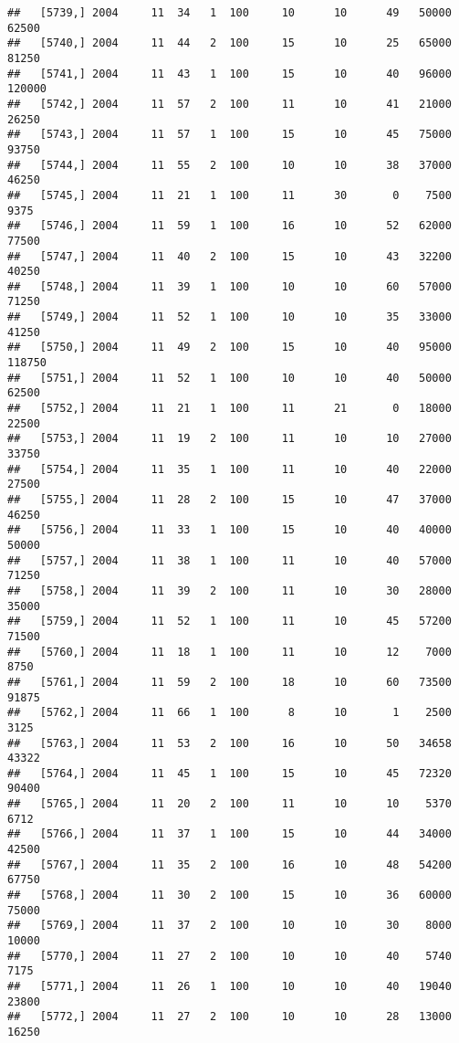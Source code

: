 \documentclass{article}\usepackage[]{graphicx}\usepackage[]{color}
\makeatletter
\newenvironment{kframe}{%
 \def\at@end@of@kframe{}%
 \ifinner\ifhmode%
  \def\at@end@of@kframe{\end{minipage}}%
  \begin{minipage}{\columnwidth}%
 \fi\fi%
 \def\FrameCommand##1{\hskip\@totalleftmargin \hskip-\fboxsep
 \colorbox{shadecolor}{##1}\hskip-\fboxsep
     \hskip-\linewidth \hskip-\@totalleftmargin \hskip\columnwidth}%
 \MakeFramed {\advance\hsize-\width
   \@totalleftmargin\z@ \linewidth\hsize
   \@setminipage}}%
 {\par\unskip\endMakeFramed%
 \at@end@of@kframe}
\newenvironment{knitrout}{}{} %
\makeatother
\begin{document}
\begin{knitrout}
\begin{kframe}
\begin{verbatim}
##   [5739,] 2004     11  34   1  100     10      10      49   50000   62500
##   [5740,] 2004     11  44   2  100     15      10      25   65000   81250
##   [5741,] 2004     11  43   1  100     15      10      40   96000  120000
##   [5742,] 2004     11  57   2  100     11      10      41   21000   26250
##   [5743,] 2004     11  57   1  100     15      10      45   75000   93750
##   [5744,] 2004     11  55   2  100     10      10      38   37000   46250
##   [5745,] 2004     11  21   1  100     11      30       0    7500    9375
##   [5746,] 2004     11  59   1  100     16      10      52   62000   77500
##   [5747,] 2004     11  40   2  100     15      10      43   32200   40250
##   [5748,] 2004     11  39   1  100     10      10      60   57000   71250
##   [5749,] 2004     11  52   1  100     10      10      35   33000   41250
##   [5750,] 2004     11  49   2  100     15      10      40   95000  118750
##   [5751,] 2004     11  52   1  100     10      10      40   50000   62500
##   [5752,] 2004     11  21   1  100     11      21       0   18000   22500
##   [5753,] 2004     11  19   2  100     11      10      10   27000   33750
##   [5754,] 2004     11  35   1  100     11      10      40   22000   27500
##   [5755,] 2004     11  28   2  100     15      10      47   37000   46250
##   [5756,] 2004     11  33   1  100     15      10      40   40000   50000
##   [5757,] 2004     11  38   1  100     11      10      40   57000   71250
##   [5758,] 2004     11  39   2  100     11      10      30   28000   35000
##   [5759,] 2004     11  52   1  100     11      10      45   57200   71500
##   [5760,] 2004     11  18   1  100     11      10      12    7000    8750
##   [5761,] 2004     11  59   2  100     18      10      60   73500   91875
##   [5762,] 2004     11  66   1  100      8      10       1    2500    3125
##   [5763,] 2004     11  53   2  100     16      10      50   34658   43322
##   [5764,] 2004     11  45   1  100     15      10      45   72320   90400
##   [5765,] 2004     11  20   2  100     11      10      10    5370    6712
##   [5766,] 2004     11  37   1  100     15      10      44   34000   42500
##   [5767,] 2004     11  35   2  100     16      10      48   54200   67750
##   [5768,] 2004     11  30   2  100     15      10      36   60000   75000
##   [5769,] 2004     11  37   2  100     10      10      30    8000   10000
##   [5770,] 2004     11  27   2  100     10      10      40    5740    7175
##   [5771,] 2004     11  26   1  100     10      10      40   19040   23800
##   [5772,] 2004     11  27   2  100     10      10      28   13000   16250

\end{verbatim}
\end{kframe}
\end{knitrout}
\end{document}
